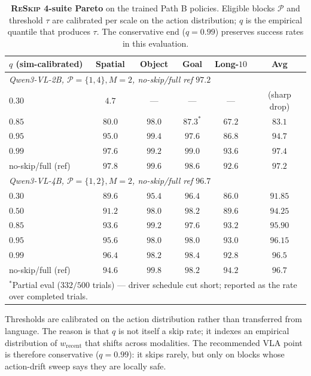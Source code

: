 \documentclass{article}
\newcommand{\reskip}{\textsc{ReSkip}}
\begin{document}
\begin{table}[t]
\caption{\textbf{\reskip{} 4-suite Pareto} on the trained Path B policies. Eligible blocks $\mathcal{P}$ and threshold $\tau$ are calibrated per scale on the action distribution; $q$ is the empirical quantile that produces $\tau$. The conservative end ($q{=}0.99$) preserves success rates in this evaluation.}
\label{tab:vla_reskip_pareto}
\centering\small
\setlength{\tabcolsep}{4pt}
\begin{tabular}{lccccc}
\toprule
$q$ (sim-calibrated) & Spatial & Object & Goal & Long-$10$ & \textbf{Avg} \\
\midrule
\multicolumn{6}{l}{\emph{Qwen3-VL-2B, $\mathcal{P}{=}\{1,4\}, M{=}2$, no-skip/full ref $97.2$}} \\
\midrule
$0.30$              & $4.7$  & ---     & ---     & ---     & (sharp drop) \\
$0.85$              & $80.0$ & $98.0$  & $87.3^\ast$ & $67.2$  & $83.1$ \\
$0.95$              & $95.0$ & $99.4$  & $97.6$  & $86.8$  & $94.7$ \\
$\mathbf{0.99}$     & $\mathbf{97.6}$ & $\mathbf{99.2}$  & $\mathbf{99.0}$  & $\mathbf{93.6}$  & $\mathbf{97.4}$ \\
no-skip/full (ref)  & $97.8$ & $99.6$  & $98.6$  & $92.6$  & $97.2$ \\
\midrule
\multicolumn{6}{l}{\emph{Qwen3-VL-4B, $\mathcal{P}{=}\{1,2\}, M{=}2$, no-skip/full ref $96.7$}} \\
\midrule
$0.30$              & $89.6$ & $95.4$  & $96.4$  & $86.0$  & $91.85$ \\
$0.50$              & $91.2$ & $98.0$  & $98.2$  & $89.6$  & $94.25$ \\
$0.85$              & $93.6$ & $99.2$  & $97.6$  & $93.2$  & $95.90$ \\
$0.95$              & $95.6$ & $98.0$  & $98.0$  & $93.0$  & $96.15$ \\
$\mathbf{0.99}$     & $\mathbf{96.4}$ & $\mathbf{98.2}$  & $\mathbf{98.4}$  & $\mathbf{92.8}$  & $\mathbf{96.5}$ \\
no-skip/full (ref)  & $94.6$ & $99.8$  & $98.2$  & $94.2$  & $96.7$ \\
\bottomrule
\multicolumn{6}{p{14cm}}{\footnotesize $^\ast$Partial eval ($332/500$ trials) — driver schedule cut short; reported as the rate over completed trials.}
\end{tabular}
\end{table}

Thresholds are calibrated on the action distribution rather than transferred from language. The reason is that $q$ is not itself a skip rate; it indexes an empirical distribution of $w_{\text{recent}}$ that shifts across modalities. The recommended VLA point is therefore conservative ($q{=}0.99$): it skips rarely, but only on blocks whose action-drift sweep says they are locally safe.
\end{document}
